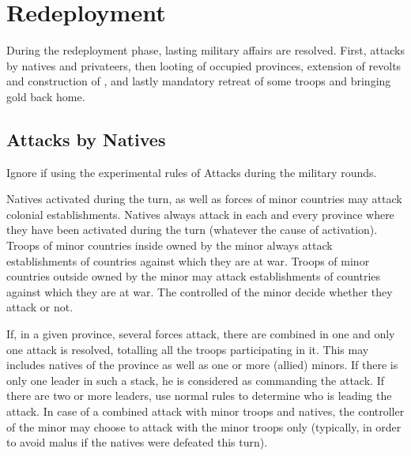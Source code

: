 \chapter{Redeployment}\label{chapter:Redep}


During the redeployment phase, lasting military affairs are resolved. First,
attacks by natives and privateers, then looting of occupied provinces,
extension of revolts and construction of \Presidios, and lastly mandatory
retreat of some troops and bringing \ROTW gold back home.

\RedepPhase

\section{Attacks by Natives}\label{chRedep:Native Attack}
\begin{designnote}
  Ignore if using the experimental rules of Attacks during the military
  rounds.
\end{designnote}

\aparag Natives activated during the turn, as well as forces of \ROTW minor
countries may attack colonial establishments.
\bparag Natives always attack in each and every province where they have been
activated during the turn (whatever the cause of activation).
\bparag Troops of \ROTW minor countries inside \Areas owned by the minor
always attack establishments of countries against which they are at war.
\bparag Troops of \ROTW minor countries outside \Areas owned by the minor may
attack establishments of countries against which they are at war. The
controlled of the minor decide whether they attack or not.

\bparag If, in a given province, several forces attack, there are combined in
one and only one attack is resolved, totalling all the troops participating in
it.
\bparag This may includes natives of the province as well as one or more
(allied) \ROTW minors.
\bparag If there is only one leader in such a stack, he is considered as
commanding the attack. If there are two or more leaders, use normal rules to
determine who is leading the attack.
\bparag In case of a combined attack with minor troops and natives, the
controller of the minor may choose to attack with the minor troops only
(typically, in order to avoid malus if the natives were defeated this turn).

